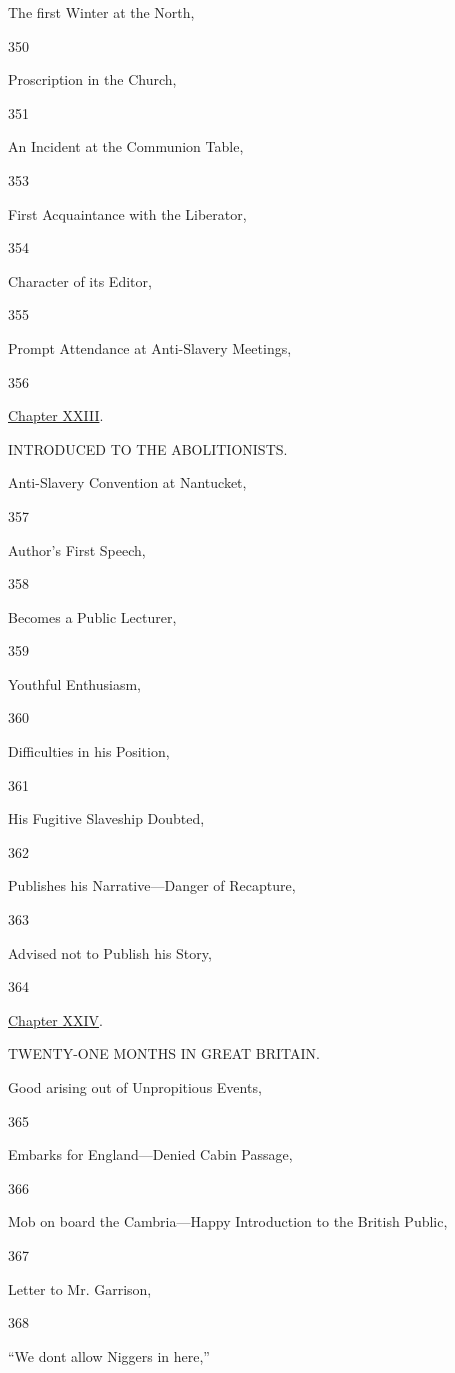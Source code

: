 The first Winter at the North,

350

Proscription in the Church,

351

An Incident at the Communion Table,

353

First Acquaintance with the Liberator,

354

Character of its Editor,

355

Prompt Attendance at Anti-Slavery Meetings,

356

\href{/wiki/My_Bondage_and_My_Freedom_(1855)/Chapter_XXIII}{Chapter
XXIII}.

INTRODUCED TO THE ABOLITIONISTS.

Anti-Slavery Convention at Nantucket,

357

Author's First Speech,

358

Becomes a Public Lecturer,

359

Youthful Enthusiasm,

360

Difficulties in his Position,

361

His Fugitive Slaveship Doubted,

362

Publishes his Narrative---Danger of Recapture,

363

Advised not to Publish his Story,

364

\href{/wiki/My_Bondage_and_My_Freedom_(1855)/Chapter_XXIV}{Chapter
XXIV}.

TWENTY-ONE MONTHS IN GREAT BRITAIN.

Good arising out of Unpropitious Events,

365

Embarks for England---Denied Cabin Passage,

366

Mob on board the Cambria---Happy Introduction to the British Public,

367

Letter to Mr. Garrison,

368

``We dont allow Niggers in here,''


